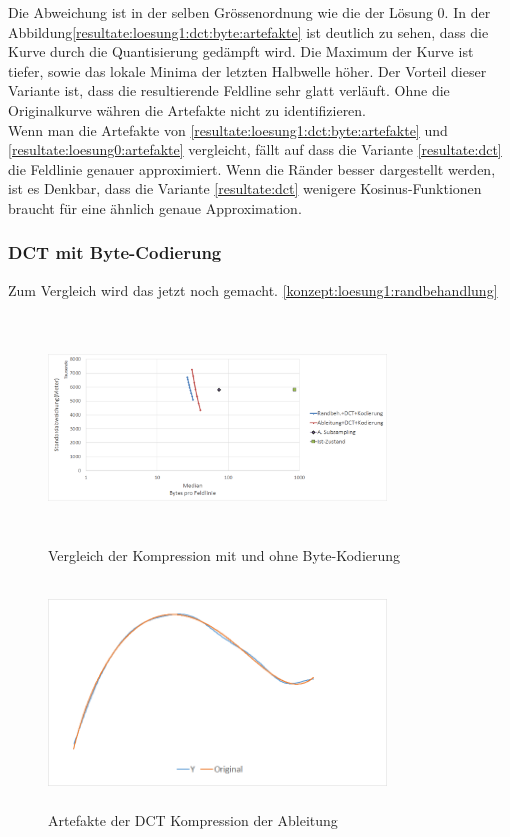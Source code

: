 Die Abweichung ist in der selben Grössenordnung wie die der Lösung 0. In der Abbildung\ref{resultate:loesung1:dct:byte:artefakte} ist deutlich zu sehen, dass die Kurve durch die Quantisierung gedämpft wird. Die Maximum der Kurve ist tiefer, sowie das lokale Minima der letzten Halbwelle höher. Der Vorteil dieser Variante ist, dass die resultierende Feldline sehr glatt verläuft. Ohne die Originalkurve währen die Artefakte nicht zu identifizieren.\\
Wenn man die Artefakte von \ref{resultate:loesung1:dct:byte:artefakte} und \ref{resultate:loesung0:artefakte} vergleicht, fällt auf dass die Variante \ref{resultate:dct} die Feldlinie genauer approximiert. Wenn die Ränder besser dargestellt werden, ist es Denkbar, dass die Variante \ref{resultate:dct} wenigere Kosinus-Funktionen braucht für eine ähnlich genaue Approximation.

\subsubsection{DCT mit Byte-Codierung}
Zum Vergleich wird das jetzt noch gemacht. \ref{konzept:loesung1:randbehandlung}
\begin{figure}[!htbp]
	\center
	\includegraphics[width=0.8\textwidth,height=6cm,keepaspectratio]{./pictures/resultate/loesung1/loesung1-7/loesung1_7.png}
	\caption{Vergleich der Kompression mit und ohne Byte-Kodierung}
	\label{resultate:loesung1:dct:randbehandlung}
\end{figure}

\begin{figure}[!htbp]
	\center
	\includegraphics[width=0.8\textwidth,height=6cm,keepaspectratio]{./pictures/resultate/loesung1/loesung1-7/artefakte.png}
	\caption{Artefakte der DCT Kompression der Ableitung}
	\label{resultate:loesung1:puredct:byte:artefakte:}
\end{figure} 
